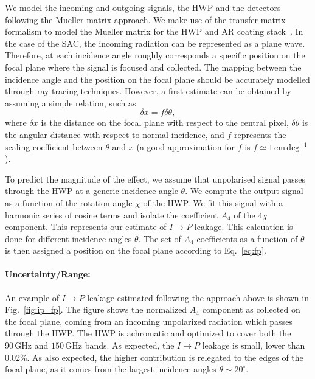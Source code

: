 We model the incoming and outgoing signals, the HWP and the detectors following the Mueller matrix approach. We make use of the transfer matrix formalism to model the Mueller matrix for the HWP and AR coating stack~\cite{Essinger-Hileman_TM}. In the case of the SAC, the incoming radiation can be represented as a plane wave. Therefore, at each incidence angle roughly corresponds a specific position on the focal plane where the signal is focused and collected. The mapping between the incidence angle and the position on the focal plane should be accurately modelled through ray-tracing techniques. However, a first estimate can be obtained by assuming a simple relation, such as 
\begin{equation}\label{eq:fp}
\delta x= f \delta \theta,
\end{equation}
where $\delta x$ is the distance on the focal plane with respect to the central pixel, $\delta \theta$ is the angular distance with respect to normal incidence, and $f$ represents the scaling coefficient between $\theta$ and $x$ (a good approximation for $f$ is $f\simeq 1\,\mathrm{cm\,deg^{-1}}$).

To predict the magnitude of the effect, we assume that unpolarised signal passes through the HWP at a generic incidence angle $\theta$. We compute the output signal as a function of the rotation angle $\chi$ of the HWP. We fit this signal with a harmonic series of cosine terms and isolate the coefficient $A_4$ of the $4\chi$ component. This represents our estimate of $I\rightarrow P$ leakage. This calcuation is done for different incidence angles $\theta$. The set of $A_4$ coefficients as a function of $\theta$ is then assigned a position on the focal plane according to Eq.~\ref{eq:fp}.

\paragraph{Uncertainty/Range:}
An example of $I\rightarrow P$ leakage estimated following the approach above is shown in Fig.~\ref{fig:ip_fp}. The figure shows the normalized $A_4$ component as collected on the focal plane, coming from an incoming unpolarized radiation which passes through the HWP. The HWP is achromatic and optimized to cover both the $90\,\mathrm{GHz}$ and $150\,\mathrm{GHz}$ bands. As expected, the $I\rightarrow P$ leakage is small, lower than 0.02\%. As also expected, the higher contribution is relegated to the edges of the focal plane, as it comes from the largest incidence angles $\theta\sim 20^\circ$.

